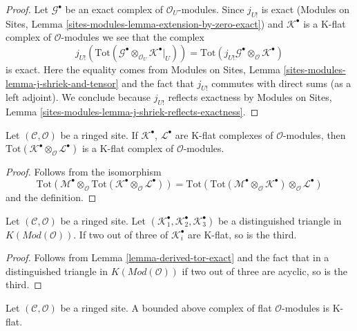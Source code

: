 \begin{proof}
Let $\mathcal{G}^\bullet$ be an exact complex of $\mathcal{O}_U$-modules.
Since $j_{U!}$ is exact
(Modules on Sites, Lemma \ref{sites-modules-lemma-extension-by-zero-exact})
and $\mathcal{K}^\bullet$ is a K-flat complex of $\mathcal{O}$-modules
we see that the complex
$$
j_{U!}(\text{Tot}(\mathcal{G}^\bullet \otimes_{\mathcal{O}_U}
\mathcal{K}^\bullet|_U)) =
\text{Tot}(j_{U!}\mathcal{G}^\bullet \otimes_\mathcal{O} \mathcal{K}^\bullet)
$$
is exact. Here the equality comes from
Modules on Sites, Lemma \ref{sites-modules-lemma-j-shriek-and-tensor}
and the fact that $j_{U!}$ commutes with direct sums (as a left adjoint).
We conclude because $j_{U!}$ reflects exactness by
Modules on Sites, Lemma \ref{sites-modules-lemma-j-shriek-reflects-exactness}.
\end{proof}

\begin{lemma}
\label{lemma-tensor-product-K-flat}
Let $(\mathcal{C}, \mathcal{O})$ be a ringed site.
If $\mathcal{K}^\bullet$, $\mathcal{L}^\bullet$ are K-flat complexes
of $\mathcal{O}$-modules, then
$\text{Tot}(\mathcal{K}^\bullet \otimes_\mathcal{O} \mathcal{L}^\bullet)$
is a K-flat complex of $\mathcal{O}$-modules.
\end{lemma}

\begin{proof}
Follows from the isomorphism
$$
\text{Tot}(\mathcal{M}^\bullet \otimes_\mathcal{O}
\text{Tot}(\mathcal{K}^\bullet \otimes_\mathcal{O} \mathcal{L}^\bullet))
=
\text{Tot}(\text{Tot}(\mathcal{M}^\bullet \otimes_\mathcal{O}
\mathcal{K}^\bullet) \otimes_\mathcal{O} \mathcal{L}^\bullet)
$$
and the definition.
\end{proof}

\begin{lemma}
\label{lemma-K-flat-two-out-of-three}
Let $(\mathcal{C}, \mathcal{O})$ be a ringed site.
Let $(\mathcal{K}_1^\bullet, \mathcal{K}_2^\bullet, \mathcal{K}_3^\bullet)$
be a distinguished triangle in $K(\textit{Mod}(\mathcal{O}))$.
If two out of three of $\mathcal{K}_i^\bullet$ are K-flat, so is the third.
\end{lemma}

\begin{proof}
Follows from
Lemma \ref{lemma-derived-tor-exact}
and the fact that in a distinguished triangle in
$K(\textit{Mod}(\mathcal{O}))$
if two out of three are acyclic, so is the third.
\end{proof}

\begin{lemma}
\label{lemma-bounded-flat-K-flat}
Let $(\mathcal{C}, \mathcal{O})$ be a ringed site. A bounded above complex
of flat $\mathcal{O}$-modules is K-flat.
\end{lemma}

